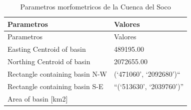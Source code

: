 \documentclass[11pt,]{article}
\begin{document}
\begin{longtable}[]{@{}ll@{}}
\caption{\label{tablasiete}Parametros morfometricos de la Cuenca del
Soco}\tabularnewline
\toprule
\begin{minipage}[b]{0.66\columnwidth}\raggedright\strut
Parametros\strut
\end{minipage} & \begin{minipage}[b]{0.28\columnwidth}\raggedright\strut
Valores\strut
\end{minipage}\tabularnewline
\midrule
\endfirsthead
\toprule
\begin{minipage}[b]{0.66\columnwidth}\raggedright\strut
Parametros\strut
\end{minipage} & \begin{minipage}[b]{0.28\columnwidth}\raggedright\strut
Valores\strut
\end{minipage}\tabularnewline
\midrule
\endhead
\begin{minipage}[t]{0.66\columnwidth}\raggedright\strut
Easting Centroid of basin\strut
\end{minipage} & \begin{minipage}[t]{0.28\columnwidth}\raggedright\strut
489195.00\strut
\end{minipage}\tabularnewline
\begin{minipage}[t]{0.66\columnwidth}\raggedright\strut
Northing Centroid of basin\strut
\end{minipage} & \begin{minipage}[t]{0.28\columnwidth}\raggedright\strut
2072655.00\strut
\end{minipage}\tabularnewline
\begin{minipage}[t]{0.66\columnwidth}\raggedright\strut
Rectangle containing basin N-W\strut
\end{minipage} & \begin{minipage}[t]{0.28\columnwidth}\raggedright\strut
(`471060', `2092680')``\strut
\end{minipage}\tabularnewline
\begin{minipage}[t]{0.66\columnwidth}\raggedright\strut
Rectangle containing basin S-E\strut
\end{minipage} & \begin{minipage}[t]{0.28\columnwidth}\raggedright\strut
``(`513630', `2039760')''\strut
\end{minipage}\tabularnewline
\begin{minipage}[t]{0.66\columnwidth}\raggedright\strut
Area of basin {[}km2{]}\strut
\end{minipage} & \begin{minipage}[t]{0.28\columnwidth}\raggedright\strut

\end{minipage}
\end{longtable}
\end{document}
